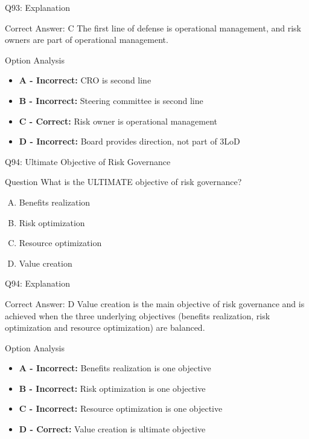 \documentclass{beamer}
\begin{document}
	\begin{frame}{Q93: Explanation}
		\begin{block}{Correct Answer: C}
			The first line of defense is operational management, and risk owners are part of operational management.
		\end{block}
		\begin{block}{Option Analysis}
			\begin{itemize}
				\item \textbf{A - Incorrect:} CRO is second line
				\item \textbf{B - Incorrect:} Steering committee is second line
				\item \textbf{C - Correct:} Risk owner is operational management
				\item \textbf{D - Incorrect:} Board provides direction, not part of 3LoD
			\end{itemize}
		\end{block}
	\end{frame}
	
	\begin{frame}{Q94: Ultimate Objective of Risk Governance}
		\begin{block}{Question}
			What is the ULTIMATE objective of risk governance?
		\end{block}
		\begin{enumerate}[(A)]
			\item Benefits realization
			\item Risk optimization
			\item Resource optimization
			\item Value creation
		\end{enumerate}
	\end{frame}
	
	\begin{frame}{Q94: Explanation}
		\begin{block}{Correct Answer: D}
			Value creation is the main objective of risk governance and is achieved when the three underlying objectives (benefits realization, risk optimization and resource optimization) are balanced.
		\end{block}
		\begin{block}{Option Analysis}
			\begin{itemize}
				\item \textbf{A - Incorrect:} Benefits realization is one objective
				\item \textbf{B - Incorrect:} Risk optimization is one objective
				\item \textbf{C - Incorrect:} Resource optimization is one objective
				\item \textbf{D - Correct:} Value creation is ultimate objective
			\end{itemize}
		\end{block}
	\end{frame}
	
\end{document}
